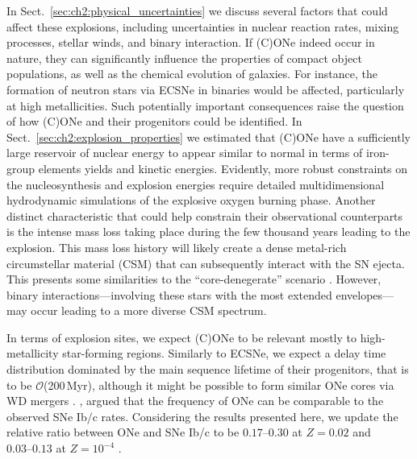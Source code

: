 \documentclass[main.tex]{subfiles}
\begin{document}
In Sect.~\ref{sec:ch2:physical_uncertainties} we discuss several factors that could affect these explosions, including uncertainties in nuclear reaction rates, mixing processes, stellar winds, and binary interaction. If (C)ONe \ias indeed occur in nature, they can significantly influence the properties of compact object populations, as well as the chemical evolution of galaxies. For instance, the formation of neutron stars via ECSNe in binaries would be affected, particularly at high metallicities. Such potentially important consequences raise the question of how (C)ONe \ias and their progenitors could  be identified. In Sect.~\ref{sec:ch2:explosion_properties} we estimated that (C)ONe \ias have a sufficiently large reservoir of nuclear energy to appear similar to normal \ias in terms of iron-group elements yields and kinetic energies. Evidently, more robust constraints on the nucleosynthesis and  explosion energies require detailed multidimensional hydrodynamic simulations of the explosive oxygen burning phase. Another distinct characteristic that could help constrain their observational counterparts is the intense mass loss taking place during the few thousand years leading to the explosion. This mass loss history will likely create  a dense metal-rich circumstellar material (CSM) that can subsequently interact with the SN ejecta. This presents some similarities to the ``core-denegerate'' \ia scenario \citep[e.g.,][]{Wang:2016alt,soker2019,Soker:2021dii}. However, binary interactions---involving these stars with the most extended envelopes---may occur leading to a more diverse CSM spectrum.

In terms of explosion sites, we expect (C)ONe \ias to be relevant mostly to high-metallicity star-forming regions. Similarly to ECSNe, we expect a delay time distribution dominated by the main sequence lifetime of their progenitors, that is to be $\mathcal{O}$(200\,Myr), although it might be possible to form similar ONe cores via WD mergers \citep{Schwab:2016lep}.
\cite{antoniadis2020}, argued that the frequency of ONe \ias can be comparable to the observed SNe Ib/c rates. Considering the results presented here, we update the relative ratio between ONe \ias and SNe Ib/c to be $\numrange{0.17}{0.30}$ at $Z=0.02$ and $\numrange{0.03}{0.13}$ at $Z=10^{-4}$ \citep[assuming a][initial mass function]{Chabrier:2004vw}.
\end{document}
